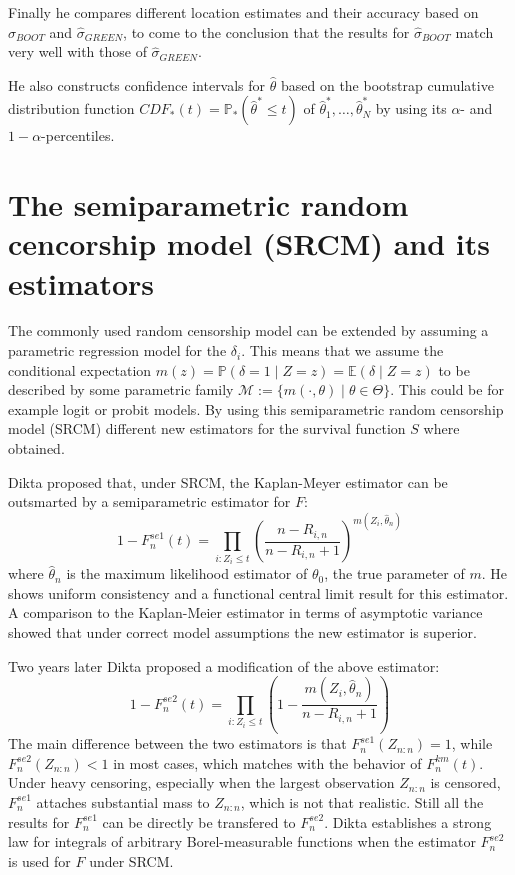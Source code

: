 Finally he compares different location estimates and their accuracy based on $\hat{\sigma}_{BOOT}$ and $\hat{\sigma}_{GREEN}$, to come to the conclusion that the results for $\hat{\sigma}_{BOOT}$ match very well with those of $\hat{\sigma}_{GREEN}$.

He also constructs confidence intervals for $\hat{\theta}$ based on the bootstrap cumulative distribution function $CDF_*(t) = \mathbb{P}_*(\hat{\theta}^*\leq t)$ of $\hat{\theta}_1^*,\ldots,\hat{\theta}_N^*$ by using its $\alpha$- and $1-\alpha$-percentiles.


\section{The semiparametric random cencorship model (SRCM) and its estimators}

The commonly used random censorship model can be extended by assuming a parametric regression model for the $\delta_i$. This means that we assume the conditional expectation $m(z) = \mathbb{P}(\delta = 1\mid Z=z) = \mathbb{E}(\delta \mid Z=z)$ to be described by some parametric family $\mathcal{M}:= \{m(\cdotp,\theta) \mid \theta \in \Theta\}$. This could be for example logit or probit models. 
By using this semiparametric random censorship model (SRCM) different new estimators for the survival function $S$ where obtained.

Dikta proposed that, under SRCM, the Kaplan-Meyer estimator can be outsmarted by a semiparametric estimator for $F$:
\begin{equation}\label{fnse1}
1-F_n^{se1}(t) = \prod_{i:Z_i \leq t} \left( \frac{n-R_{i,n}}{n-R_{i,n} + 1} \right)^{m(Z_i,\hat{\theta}_n)}
\end{equation}
where $\hat{\theta}_n$ is the maximum likelihood estimator of $\theta_0$, the true parameter of $m$.
He shows uniform consistency and a functional central limit result for this estimator. A comparison to the Kaplan-Meier estimator in terms of asymptotic variance showed that under correct model assumptions the new estimator is superior\cite{PAPER2}.

Two years later Dikta proposed a modification of the above estimator:
\begin{equation}\label{fnse2}
1-F_n^{se2}(t) = \prod_{i:Z_i \leq t} \left( 1 - \frac{m(Z_i,\hat{\theta}_n)}{n-R_{i,n} + 1} \right)
\end{equation}
The main difference between the two estimators is that $F_n^{se1}(Z_{n:n}) = 1$, while $F_n^{se2}(Z_{n:n}) < 1$ in most cases, which matches with the behavior of $F_n^{km}(t)$. Under heavy censoring, especially when the largest observation $Z_{n:n}$ is censored, $F_n^{se1}$ attaches substantial mass to $Z_{n:n}$, which is not that realistic. Still all the results for $F_n^{se1}$ can be directly be transfered to $F_n^{se2}$. 
Dikta establishes a strong law for integrals of arbitrary Borel-measurable functions when the estimator $F_n^{se2}$ is used for $F$ under SRCM\cite{PAPER3}.

